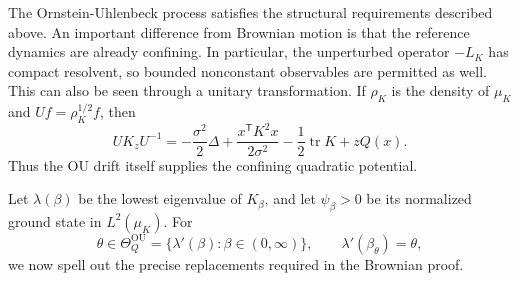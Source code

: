 \documentclass[11pt,reqno]{amsart}
\theoremstyle{definition}
\numberwithin{equation}{section}
\newcommand{\<}{\langle}
\renewcommand{\>}{\rangle}
\begin{document}
The Ornstein-Uhlenbeck process satisfies the structural requirements
described above.  An important difference from Brownian motion is that the
reference dynamics are already confining.  In particular, the unperturbed
operator $-L_K$ has compact resolvent, so bounded nonconstant observables
are permitted as well.  This can also be seen through a unitary
transformation.  If $\rho_K$ is the density of $\mu_K$ and
$Uf=\rho_K^{1/2}f$, then
\[
    UK_zU^{-1}
      =-\frac{\sigma^2}{2}\Delta
        +\frac{x^{\mathsf T}K^2x}{2\sigma^2}
        -\frac12\operatorname{tr}K+zQ(x).
\]
Thus the OU drift itself supplies the confining quadratic potential.

Let $\lambda(\beta)$ be the lowest eigenvalue of $K_\beta$, and let
$\psi_\beta>0$ be its normalized ground state in $L^2(\mu_K)$.  For
\[
    \theta\in\Theta_Q^{\mathrm{OU}}
       = \{ \lambda'(\beta): \beta \in (0,\infty) \},
    \qquad
    \lambda'(\beta_\theta)=\theta,
\]
we now spell out the precise replacements required in the Brownian proof.
\end{document}
